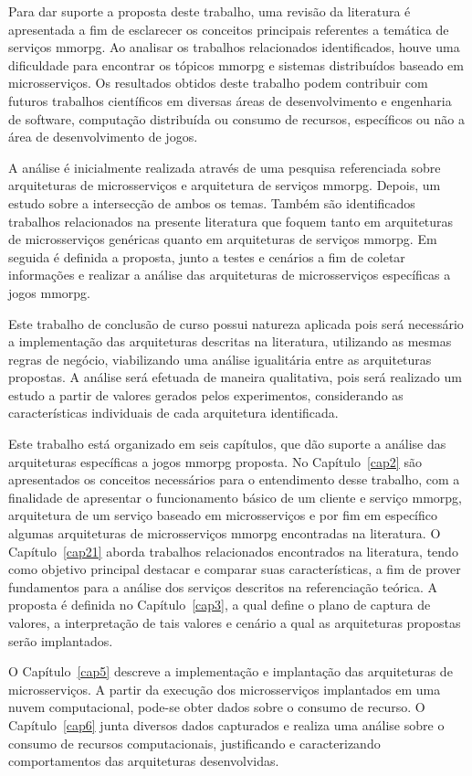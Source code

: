 Para dar suporte a proposta deste trabalho, uma revisão da literatura é apresentada a fim de esclarecer os conceitos principais referentes a temática de serviços \ac{mmorpg}.
%
Ao analisar os trabalhos relacionados identificados, houve uma dificuldade para encontrar os tópicos \ac{mmorpg} e sistemas distribuídos baseado em microsserviços.
%
Os resultados obtidos deste trabalho podem contribuir com futuros trabalhos científicos em diversas áreas de desenvolvimento e engenharia de software, computação distribuída ou consumo de recursos, específicos ou não a área de desenvolvimento de jogos.



A análise é inicialmente realizada através de uma pesquisa referenciada sobre arquiteturas de microsserviços e arquitetura de serviços \ac{mmorpg}.
%
Depois, um estudo sobre a intersecção de ambos os temas.
%
Também são identificados trabalhos relacionados na presente literatura que foquem tanto em arquiteturas de  microsserviços genéricas quanto em arquiteturas de serviços \ac{mmorpg}.
%
Em seguida é definida a proposta, junto a testes e cenários a fim de coletar informações e realizar a análise das arquiteturas de microsserviços específicas a jogos \ac{mmorpg}. 


Este trabalho de conclusão de curso possui natureza aplicada pois será necessário a implementação das arquiteturas descritas na literatura, utilizando as mesmas regras de negócio, viabilizando uma análise igualitária entre as arquiteturas propostas.
%
A análise será efetuada de maneira qualitativa, pois será realizado um estudo a partir de valores gerados pelos experimentos, considerando as características individuais de cada arquitetura identificada.


Este trabalho está organizado em seis capítulos, que dão suporte a análise das arquiteturas específicas a jogos \ac{mmorpg} proposta.
%
No Capítulo~\ref{cap2} são apresentados os conceitos necessários para o entendimento desse trabalho, com a finalidade de apresentar o funcionamento básico de um cliente e serviço \ac{mmorpg}, arquitetura de um serviço baseado em microsserviços e por fim em específico algumas arquiteturas de microsserviços \ac{mmorpg} encontradas na literatura.
%
O Capítulo~\ref{cap21} aborda trabalhos relacionados encontrados na literatura, tendo como objetivo principal destacar e comparar suas características, a fim de prover fundamentos para a análise dos serviços descritos na referenciação teórica.
%
A proposta é definida no Capítulo~\ref{cap3}, a qual define o plano de captura de valores, a interpretação de tais valores e cenário a qual as arquiteturas propostas serão implantados.

O Capítulo~\ref{cap5} descreve a implementação e implantação das arquiteturas de microsserviços.
%
A partir da execução dos microsserviços implantados em uma nuvem computacional, pode-se obter dados sobre o consumo de recurso.
%
O Capítulo~\ref{cap6} junta diversos dados capturados e realiza uma análise sobre o consumo de recursos computacionais, justificando e caracterizando comportamentos das arquiteturas desenvolvidas.


